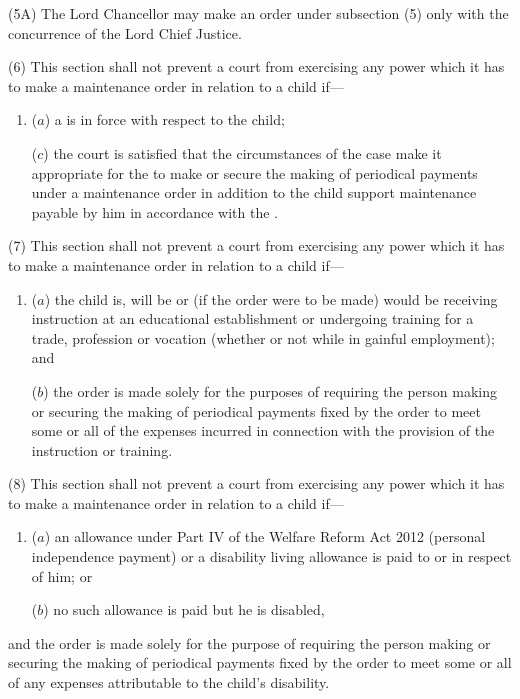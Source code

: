 \documentclass[a4paper]{article}
\begin{document}
(5A)
The Lord Chancellor may make an order under subsection (5) only with the
concurrence of the Lord Chief Justice.

(6)
This section shall not prevent a court from exercising any power which it
has to make a maintenance order in relation to a child if---
\begin{enumerate}\item[]
($a$)
a 
is in force with respect
to the child;


($c$)
the court is satisfied that the circumstances of the case make it appropriate for the 
to make or secure the making
of periodical payments under a maintenance order in addition to the child
support maintenance payable by him in accordance with the .
\end{enumerate}

(7)
This section shall not prevent a court from exercising any power which it
has to make a maintenance order in relation to a child if---
\begin{enumerate}\item[]
($a$)
the child is, will be or (if the order were to be made) would be receiving
instruction at an educational establishment or undergoing training for a
trade, profession or vocation (whether or not while in gainful employment); and

($b$)
the order is made solely for the purposes of requiring the person making
or securing the making of periodical payments fixed by the order to meet
some or all of the expenses incurred in connection with the provision of
the instruction or training.
\end{enumerate}

(8)
This section shall not prevent a court from exercising any power which it
has to make a maintenance order in relation to a child if---
\begin{enumerate}\item[]
($a$) an allowance under Part IV of the Welfare Reform Act 2012 (personal independence payment) or
a disability living allowance is paid to or in respect of him; or

($b$)
no such allowance is paid but he is disabled,
\end{enumerate}
and the order is made solely for the purpose of requiring the person making or
securing the making of periodical payments fixed by the order to meet some or all
of any expenses attributable to the child’s disability.
\end{document}
